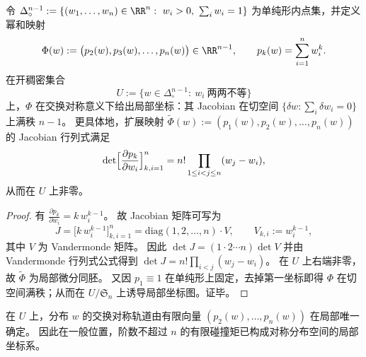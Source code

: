 \begin{theorem}\label{thm:pom-power-sum-vandermonde-jacobian}
令 \(\Delta^{n-1}_{\circ}:=\{(w_1,\dots,w_n)\in\RR^n:\ w_i>0,\ \sum_i w_i=1\}\) 为单纯形内点集，并定义幂和映射
\[
\Phi(w):=\bigl(p_2(w),p_3(w),\dots,p_n(w)\bigr)\in\RR^{n-1},
\qquad
p_k(w)=\sum_{i=1}^n w_i^k.
\]
在开稠密集合
\[
U:=\{w\in\Delta^{n-1}_{\circ}:\ w_i\ \text{两两不等}\}
\]
上，\(\Phi\) 在交换对称意义下给出局部坐标：其 Jacobian 在切空间 \(\{\delta w:\sum_i\delta w_i=0\}\) 上满秩 \(n-1\)。
更具体地，扩展映射
\(
\widetilde\Phi(w):=(p_1(w),p_2(w),\dots,p_n(w))
\)
的 Jacobian 行列式满足
\[
\det\Bigl[\frac{\partial p_k}{\partial w_i}\Bigr]_{k,i=1}^{n}
=
n!\prod_{1\le i<j\le n}(w_j-w_i),
\]
从而在 \(U\) 上非零。
\end{theorem}
\begin{proof}
有 \(\frac{\partial p_k}{\partial w_i}=k\,w_i^{k-1}\)。
故 Jacobian 矩阵可写为
\[
J=\bigl[k\,w_i^{k-1}\bigr]_{k,i=1}^{n}
=\mathrm{diag}(1,2,\dots,n)\cdot V,
\qquad
V_{k,i}:=w_i^{k-1},
\]
其中 \(V\) 为 Vandermonde 矩阵。
因此
\(
\det J=(1\cdot2\cdots n)\det V
\)
并由 Vandermonde 行列式公式得到
\(
\det J=n!\prod_{i<j}(w_j-w_i)
\)。
在 \(U\) 上右端非零，故 \(\widetilde\Phi\) 为局部微分同胚。
又因 \(p_1\equiv 1\) 在单纯形上固定，去掉第一坐标即得 \(\Phi\) 在切空间满秩；从而在 \(U/\mathfrak{S}_n\) 上诱导局部坐标图。证毕。
\end{proof}



\begin{corollary}\label{cor:pom-power-sum-local-chart}
在 \(U\) 上，分布 \(w\) 的交换对称轨道由有限向量 \((p_2(w),\dots,p_n(w))\) 在局部唯一确定。
因此在一般位置，阶数不超过 \(n\) 的有限碰撞矩已构成对称分布空间的局部坐标系。
\end{corollary}

